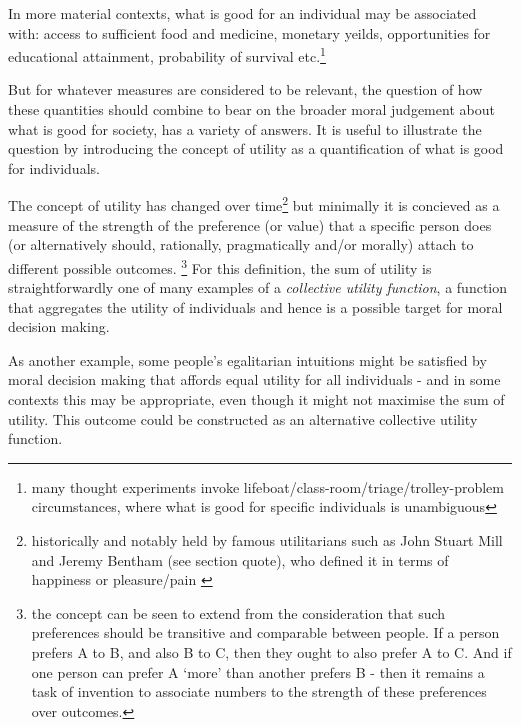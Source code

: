 In more material contexts, what is good for an individual may be associated with: access to sufficient food and medicine, monetary yeilds, opportunities for educational attainment, probability of survival etc.\footnote{many thought experiments invoke lifeboat/class-room/triage/trolley-problem circumstances, where what is good for specific individuals is unambiguous}

But for whatever measures are considered to be relevant, the question of how these quantities should combine to bear on the broader moral judgement about what is good for society, has a variety of answers.
It is useful to illustrate the question by introducing the concept of utility as a quantification of what is good for individuals.

The concept of utility has changed over time\footnote{historically and notably held by famous utilitarians such as John Stuart Mill\cite{MillGutenberg} and Jeremy Bentham (see section quote), who defined it in terms of happiness or pleasure/pain \cite{bentham1823introduction}}
but minimally it is concieved as a measure of the strength of the preference (or value) that a specific person does (or alternatively should, rationally, pragmatically and/or morally) attach to different possible outcomes.%
\footnote{the concept can be seen to extend from the consideration that such preferences should be transitive and comparable between people. If a person prefers A to B, and also B to C, then they ought to also prefer A to C. And if one person can prefer A `more' than another prefers B - then it remains a task of invention to associate numbers to the strength of these preferences over outcomes.}
For this definition, the sum of utility is straightforwardly one of many examples of a \textit{collective utility function}, a function that aggregates the utility of individuals and hence is a possible target for moral decision making.\cite{TheoriesofValueAggregation}

As another example, some people's egalitarian intuitions might be satisfied by moral decision making that affords equal utility for all individuals - and in some contexts this may be appropriate, even though it might not maximise the sum of utility. This outcome could be constructed as an alternative collective utility function.

